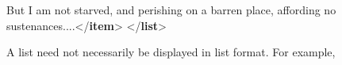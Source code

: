 \documentclass[11pt,twoside]{article}\makeatletter
\begin{document}
\begin{shaded}
\hspace*{1em}\hspace*{1em}But I am not starved, and perishing on a barren place,\mbox{}\newline 
\hspace*{1em}\hspace*{1em}\hspace*{1em}\hspace*{1em}\hspace*{1em}\hspace*{1em} affording no sustenances....{</\textbf{item}>}\mbox{}\newline 
\hspace*{1em}\mbox{}\newline 
{}\mbox{}\newline 
{</\textbf{list}>}\end{shaded}\egroup\par \par A list need not necessarily be displayed in list format.  For
example,
\end{document}
